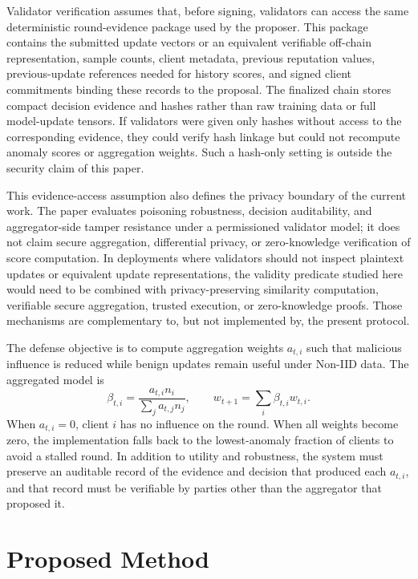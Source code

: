 \documentclass[preprint,12pt]{elsarticle}
\begin{document}
Validator verification assumes that, before signing, validators can access the same deterministic round-evidence package used by the proposer. This package contains the submitted update vectors or an equivalent verifiable off-chain representation, sample counts, client metadata, previous reputation values, previous-update references needed for history scores, and signed client commitments binding these records to the proposal. The finalized chain stores compact decision evidence and hashes rather than raw training data or full model-update tensors. If validators were given only hashes without access to the corresponding evidence, they could verify hash linkage but could not recompute anomaly scores or aggregation weights. Such a hash-only setting is outside the security claim of this paper.

This evidence-access assumption also defines the privacy boundary of the current work. The paper evaluates poisoning robustness, decision auditability, and aggregator-side tamper resistance under a permissioned validator model; it does not claim secure aggregation, differential privacy, or zero-knowledge verification of score computation. In deployments where validators should not inspect plaintext updates or equivalent update representations, the validity predicate studied here would need to be combined with privacy-preserving similarity computation, verifiable secure aggregation, trusted execution, or zero-knowledge proofs. Those mechanisms are complementary to, but not implemented by, the present protocol.

The defense objective is to compute aggregation weights $a_{t,i}$ such that malicious influence is reduced while benign updates remain useful under Non-IID data. The aggregated model is
\begin{equation}
\beta_{t,i}=\frac{a_{t,i}n_i}{\sum_j a_{t,j}n_j}, \qquad
w_{t+1}=\sum_i \beta_{t,i}w_{t,i}.
\end{equation}
When $a_{t,i}=0$, client $i$ has no influence on the round. When all weights become zero, the implementation falls back to the lowest-anomaly fraction of clients to avoid a stalled round. In addition to utility and robustness, the system must preserve an auditable record of the evidence and decision that produced each $a_{t,i}$, and that record must be verifiable by parties other than the aggregator that proposed it.

\section{Proposed Method}
\end{document}
